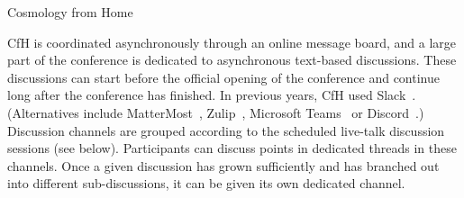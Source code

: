 \documentclass[../SustainableHEP.tex]{subfiles}
\begin{document}
\begin{casestudy}{Cosmology from Home}





CfH is coordinated asynchronously through an online message board, and a large part of the conference is dedicated to asynchronous text-based discussions. These discussions can start before the official opening of the conference and continue long after the conference has finished. In previous years, CfH used Slack~\cite{Slack}. (Alternatives include MatterMost~\cite{MatterMost}, Zulip~\cite{Zulip}, Microsoft Teams~\cite{Teams} or Discord~\cite{Discord}.)
Discussion channels are grouped according to the scheduled live-talk discussion sessions (see below). Participants can discuss points in dedicated threads in these channels. Once a given discussion has grown sufficiently and has branched out into different sub-discussions, it can be given its own dedicated channel.



\end{casestudy}
\end{document}
